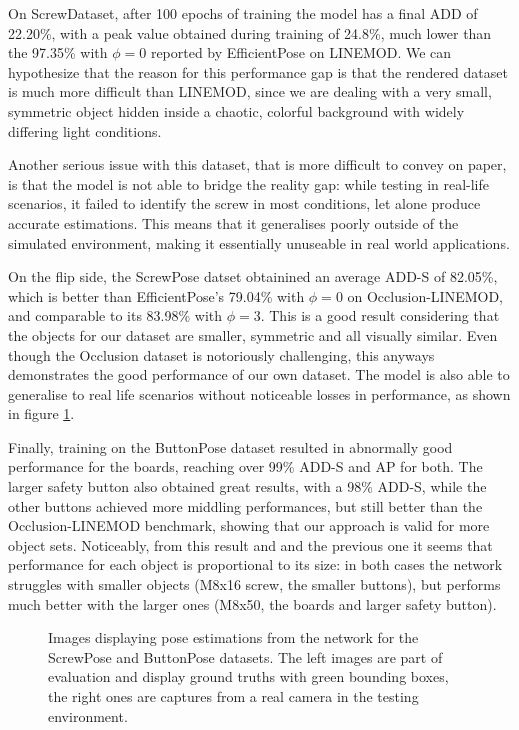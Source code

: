 On ScrewDataset, after 100 epochs of training the model has a final ADD of 22.20\%, with a peak value obtained during training of 24.8\%, much lower than the 97.35\% with $\phi=0$ reported by EfficientPose on LINEMOD. We can hypothesize that the reason for this performance gap is that the rendered dataset is much more difficult than LINEMOD, since we are dealing with a very small, symmetric object hidden inside a chaotic, colorful background with widely differing light conditions.

Another serious issue with this dataset, that is more difficult to convey on paper, is that the model is not able to bridge the reality gap: while testing in real-life scenarios, it failed to identify the screw in most conditions, let alone produce accurate estimations. This means that it generalises poorly outside of the simulated environment, making it essentially unuseable in real world applications.

On the flip side, the ScrewPose datset obtainined an average ADD-S of 82.05\%, which is better than EfficientPose's 79.04\% with $\phi=0$ on Occlusion-LINEMOD, and comparable to its 83.98\% with $\phi = 3$. This is a good result considering that the objects for our dataset are smaller, symmetric and all visually similar. Even though the Occlusion dataset is notoriously challenging, this anyways demonstrates the good performance of our own dataset. The model is also able to generalise to real life scenarios without noticeable losses in performance, as shown in figure \ref*{fig:inferencing}.

Finally, training on the ButtonPose dataset resulted in abnormally good performance for the boards, reaching over 99\% ADD-S and AP for both. The larger safety button also obtained great results, with a 98\% ADD-S, while the other buttons achieved more middling performances, but still better than the Occlusion-LINEMOD benchmark, showing that our approach is valid for more object sets. Noticeably, from this result and and the previous one it seems that performance for each object is proportional to its size: in both cases the network struggles with smaller objects (M8x16 screw, the smaller buttons), but performs much better with the larger ones (M8x50, the boards and larger safety button).

\begin{figure}[htp]


    \caption{Images displaying pose estimations from the network for the ScrewPose and ButtonPose datasets. The left images are part of evaluation and display ground truths with green bounding boxes, the right ones are captures from a real camera in the testing environment.}
    \label{fig:inferencing}
\end{figure}
